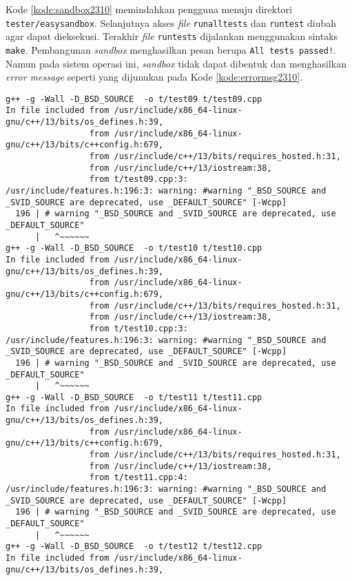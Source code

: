 Kode \ref{kode:sandbox2310} memindahkan pengguna menuju direktori \texttt{tester/easysandbox}. Selanjutnya akses \textit{file} \texttt{runalltests} dan \texttt{runtest} diubah agar dapat dieksekusi. Terakhir \textit{file} \texttt{runtests} dijalankan menggunakan sintaks \texttt{make}. Pembangunan \textit{sandbox} menghasilkan pesan berupa \texttt{All tests passed!}. Namun pada sistem operasi ini, \textit{sandbox} tidak dapat dibentuk dan menghasilkan \textit{error message} seperti yang dijunukan pada Kode \ref{kode:errormsg2310}.
\begin{lstlisting}[caption=\textit{Error message} pembangunan \textit{sandbox} pada \textit{Ubuntu} 23.10, label=kode:errormsg2310]
g++ -g -Wall -D_BSD_SOURCE  -o t/test09 t/test09.cpp
In file included from /usr/include/x86_64-linux-gnu/c++/13/bits/os_defines.h:39,
                 from /usr/include/x86_64-linux-gnu/c++/13/bits/c++config.h:679,
                 from /usr/include/c++/13/bits/requires_hosted.h:31,
                 from /usr/include/c++/13/iostream:38,
                 from t/test09.cpp:3:
/usr/include/features.h:196:3: warning: #warning "_BSD_SOURCE and _SVID_SOURCE are deprecated, use _DEFAULT_SOURCE" [-Wcpp]
  196 | # warning "_BSD_SOURCE and _SVID_SOURCE are deprecated, use _DEFAULT_SOURCE"
      |   ^~~~~~~
g++ -g -Wall -D_BSD_SOURCE  -o t/test10 t/test10.cpp
In file included from /usr/include/x86_64-linux-gnu/c++/13/bits/os_defines.h:39,
                 from /usr/include/x86_64-linux-gnu/c++/13/bits/c++config.h:679,
                 from /usr/include/c++/13/bits/requires_hosted.h:31,
                 from /usr/include/c++/13/iostream:38,
                 from t/test10.cpp:3:
/usr/include/features.h:196:3: warning: #warning "_BSD_SOURCE and _SVID_SOURCE are deprecated, use _DEFAULT_SOURCE" [-Wcpp]
  196 | # warning "_BSD_SOURCE and _SVID_SOURCE are deprecated, use _DEFAULT_SOURCE"
      |   ^~~~~~~
g++ -g -Wall -D_BSD_SOURCE  -o t/test11 t/test11.cpp
In file included from /usr/include/x86_64-linux-gnu/c++/13/bits/os_defines.h:39,
                 from /usr/include/x86_64-linux-gnu/c++/13/bits/c++config.h:679,
                 from /usr/include/c++/13/bits/requires_hosted.h:31,
                 from /usr/include/c++/13/iostream:38,
                 from t/test11.cpp:4:
/usr/include/features.h:196:3: warning: #warning "_BSD_SOURCE and _SVID_SOURCE are deprecated, use _DEFAULT_SOURCE" [-Wcpp]
  196 | # warning "_BSD_SOURCE and _SVID_SOURCE are deprecated, use _DEFAULT_SOURCE"
      |   ^~~~~~~
g++ -g -Wall -D_BSD_SOURCE  -o t/test12 t/test12.cpp
In file included from /usr/include/x86_64-linux-gnu/c++/13/bits/os_defines.h:39,

\end{lstlisting}
